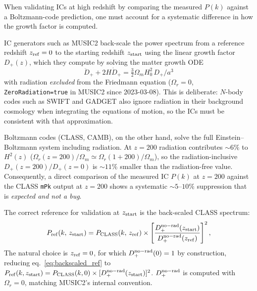 \documentclass[12pt]{article}
\begin{document}
When validating ICs at high redshift by comparing the measured $P(k)$
against a Boltzmann-code prediction, one must account for a systematic
difference in how the growth factor is computed.

IC generators such as MUSIC2 back-scale the power spectrum from a
reference redshift $z_{\rm ref}=0$ to the starting redshift $z_{\rm
start}$ using the linear growth factor $D_+(z)$, which they compute
by solving the matter growth ODE
\begin{equation}
  \ddot{D}_+ + 2H\dot{D}_+ = \tfrac{3}{2}\Omega_m H_0^2 \, D_+ / a^3
\end{equation}
with radiation \emph{excluded} from the Friedmann equation
($\Omega_r = 0$, \texttt{ZeroRadiation=true} in MUSIC2 since
2023-03-08).  This is deliberate: $N$-body codes such as SWIFT and
GADGET also ignore radiation in their background cosmology when
integrating the equations of motion, so the ICs must be consistent
with that approximation.

Boltzmann codes (CLASS, CAMB), on the other hand, solve the full
Einstein--Boltzmann system including radiation.  At $z=200$ radiation
contributes $\sim 6\%$ to $H^2(z)$
($\Omega_r(z{=}200)/\Omega_m \simeq \Omega_r(1+200)/\Omega_m$), so
the radiation-inclusive $D_+(z=200)/D_+(z=0)$ is $\sim 11\%$ smaller
than the radiation-free value.  Consequently, a direct comparison of
the measured IC $P(k)$ at $z=200$ against the CLASS \texttt{mPk}
output at $z=200$ shows a systematic $\sim 5$--$10\%$ suppression
that is \emph{expected and not a bug}.

The correct reference for validation at $z_{\rm start}$ is the
back-scaled CLASS spectrum:
\begin{equation}
  P_{\rm ref}(k,\,z_{\rm start})
  = P_{\rm CLASS}(k,\,z_{\rm ref})
    \times \left[\frac{D_+^{\rm no-rad}(z_{\rm start})}
                      {D_+^{\rm no-rad}(z_{\rm ref})}\right]^2,
  \label{eq:backscaled_ref}
\end{equation}
The natural choice is $z_{\rm ref}=0$, for which $D_+^{\rm no-rad}(0)=1$ by
construction, reducing eq.~\eqref{eq:backscaled_ref} to
$P_{\rm ref}(k,z_{\rm start}) = P_{\rm CLASS}(k,0)\times
[D_+^{\rm no-rad}(z_{\rm start})]^2$.
$D_+^{\rm no-rad}$ is computed with $\Omega_r=0$, matching MUSIC2's internal convention.
\end{document}

